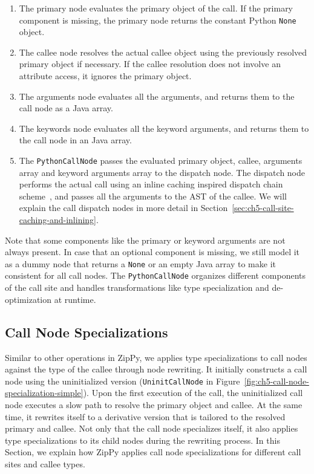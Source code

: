 \begin{enumerate}

\item The primary node evaluates the primary object of the call.
If the primary component is missing, the primary node returns the constant Python \texttt{None} object.

\item The callee node resolves the actual callee object using the previously resolved primary object if necessary.
If the callee resolution does not involve an attribute access, it ignores the primary object.

\item The arguments node evaluates all the arguments, and returns them to the call node as a Java array.

\item The keywords node evaluates all the keyword arguments, and returns them to the call node in an Java array.

\item The \texttt{PythonCallNode} passes the evaluated primary object, callee, arguments array and keyword arguments array to the dispatch node.
The dispatch node performs the actual call using an inline caching inspired dispatch chain scheme~\cite{Deutsch1984, holzle1991}, and passes all the arguments to the AST of the callee.
We will explain the call dispatch nodes in more detail in Section~\ref{sec:ch5-call-site-caching-and-inlining}.

\end{enumerate}

Note that some components like the primary or keyword arguments are not always present.
In case that an optional component is missing, we still model it as a dummy node that returns a \texttt{None} or an empty Java array to make it consistent for all call nodes.
The \texttt{PythonCallNode} organizes different components of the call site and handles transformations like type specialization and de-optimization at runtime.

\subsection{Call Node Specializations}

Similar to other operations in ZipPy, we applies type specializations to call nodes against the type of the callee through node rewriting.
It initially constructs a call node using the uninitialized version (\texttt{UninitCallNode} in Figure~\ref{fig:ch5-call-node-specialization-simple}).
Upon the first execution of the call, the uninitialized call node executes a slow path to resolve the primary object and callee.
At the same time, it rewrites itself to a derivative version that is tailored to the resolved primary and callee.
Not only that the call node specializes itself, it also applies type specializations to its child nodes during the rewriting process.
In this Section, we explain how ZipPy applies call node specializations for different call sites and callee types.


